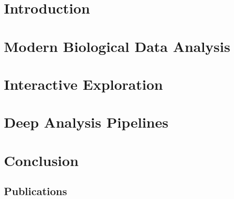 \documentclass[USenglish,phd]{uit-thesis}
\begin{document}
\frontmatter
 
 

\tableofcontents
\mainmatter

\chapter{Introduction}
 

\chapter{Modern Biological Data Analysis}


\chapter{Interactive Exploration}  


\chapter{Deep Analysis Pipelines}  


\chapter{Conclusion}
 

\appendix
\begin{appendix}
    \chapter{Publications}
\end{appendix}

\backmatter



\end{document}
